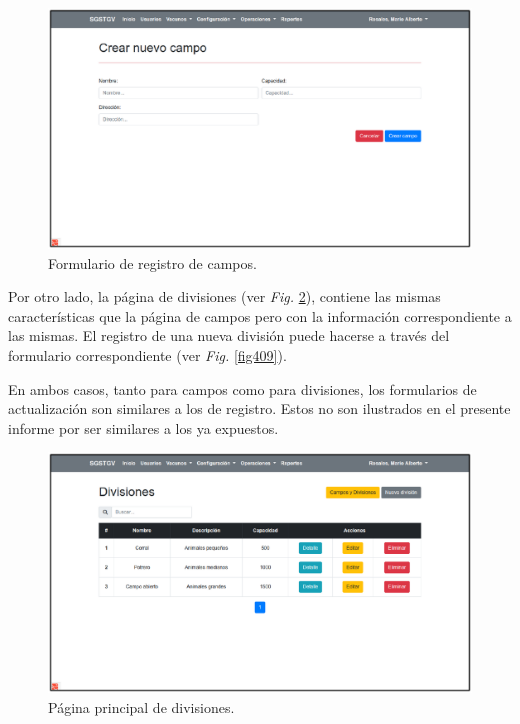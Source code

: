 \documentclass[11pt,oneside]{book}
\begin{document}
\begin{figure}[tbhp]
\centerline{\includegraphics[scale=0.87]{figs/capitulo_4_desarrollo/fig407.pdf}}
\caption{Formulario de registro de campos.}
\label{fig407}
\end{figure}

\newpage
Por otro lado, la página de divisiones (ver \textit{Fig.} \ref{fig408}), contiene las mismas características que la página de campos pero con la información correspondiente a las mismas. El registro de una nueva división puede hacerse a través del formulario correspondiente (ver \textit{Fig.} \ref{fig409}).

En ambos casos, tanto para campos como para divisiones, los formularios de actualización son similares a los de registro. Estos no son ilustrados en el presente informe por ser similares a los ya expuestos.

\begin{figure}[tbhp]
\centerline{\includegraphics[scale=0.87]{figs/capitulo_4_desarrollo/fig408.pdf}}
\caption{Página principal de divisiones.}
\label{fig408}
\end{figure}
\end{document}
